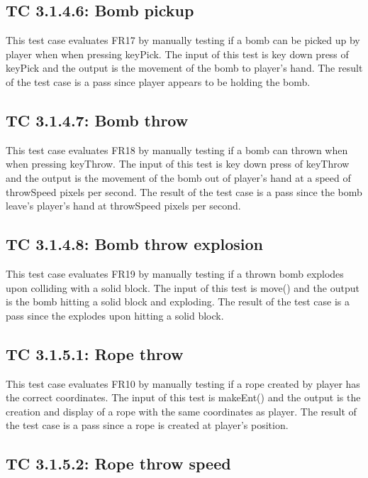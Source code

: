 \documentclass[12pt, titlepage]{article}
\begin{document}
\subsection*{TC 3.1.4.6: Bomb pickup}

This test case evaluates FR17 by manually testing if a bomb can be picked up by player when when pressing keyPick. The input of this test is key down press of keyPick and the output is the movement of the bomb to player's hand. The result of the test case is a pass since player appears to be holding the bomb.

\subsection*{TC 3.1.4.7: Bomb throw}

This test case evaluates FR18 by manually testing if a bomb can thrown when when pressing keyThrow. The input of this test is key down press of keyThrow and the output is the movement of the bomb out of player's hand at a speed of throwSpeed pixels per second. The result of the test case is a pass since the bomb leave's player's hand at throwSpeed pixels per second.

\subsection*{TC 3.1.4.8: Bomb throw explosion}

This test case evaluates FR19 by manually testing if a thrown bomb explodes upon colliding with a solid block. The input of this test is move() and the output is the bomb hitting a solid block and exploding. The result of the test case is a pass since the explodes upon hitting a solid block.

\subsection*{TC 3.1.5.1: Rope throw}

This test case evaluates FR10 by manually testing if a rope created by player has the correct coordinates. The input of this test is makeEnt() and the output is the creation and display of a rope with the same coordinates as player. The result of the test case is a pass since a rope is created at player's position. 

\subsection*{TC 3.1.5.2: Rope throw speed}
\end{document}
